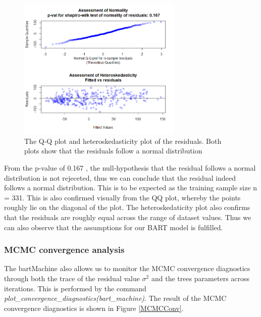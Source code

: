 \documentclass{usiinftr}
\begin{document}
\begin{figure}[h!] 
\centering
\includegraphics[width=0.7\textwidth]{images/ErrorAss.png}
\caption{The Q-Q plot and heteroskedasticity plot of the residuals. Both plots show that the residuals follow a normal distribution}
\label{ErrorAss}
\end{figure}

From the p-value of 0.167 , the null-hypothesis that the residual follows a normal distribution is not rejeceted, thus we can conclude that the residual indeed follows a normal distribution. This is to be expected as the training sample size n = 331. This is also confirmed visually from the QQ plot, whereby the points roughly lie on the diagonal of the plot. The heteroskedaticity plot also confirms that the residuals are roughly equal across the range of dataset values. Thus we can also observe that the assumptions for our BART model is fulfilled.

\subsubsection{MCMC convergence analysis}
The bartMachine also allows us to monitor the MCMC convergence diagnostics through both the trace of the residual value $\sigma^2$ and the trees parameters across iterations. This is performed by the command \textit{plot\_convergence\_diagnostics(bart\_machine)}. The result of the MCMC convergence diagnostics is shown in Figure \ref{MCMCConv}.
\end{document}
